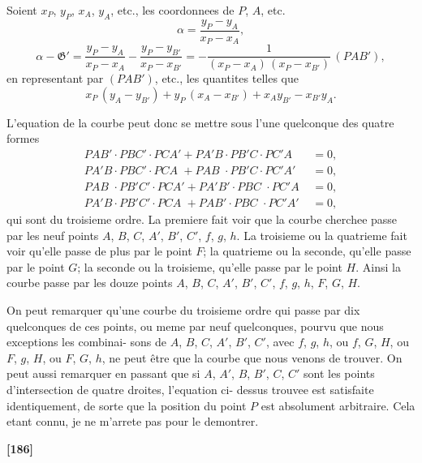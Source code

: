 \documentclass[11pt,a4paper]{article}
\begin{document}
Soient $x_P$, $y_P$, $x_A$, $y_A$, etc., les coordonnees de $P$, $A$, etc.
\[\alpha = \frac{y_P - y_A}{x_P - x_A},\]
\[\alpha - \mathfrak{G}' = \frac{y_P - y_A}{x_P - x_A} - \frac{y_P - y_{B'}}{x_P - x_{B'}} = -\frac{1}{(x_P - x_A)\, (x_P - x_{B'})}\, (PAB'),\]
en representant par $(PAB')$, etc., les quantites telles que
\[x_P\, (y_A - y_{B'}) + y_P\, (x_A - x_{B'}) + x_A y_{B'} - x_{B'} y_A.\]

L'equation de la courbe peut donc se mettre sous l'une quelconque des quatre formes
\begin{align*}
PAB' \cdot PBC' \cdot PCA' + PA'B \cdot PB'C \cdot PC'A &= 0,\\
PA'B \cdot PBC' \cdot PCA \phantom{'} + PAB \phantom{'} \cdot PB'C \cdot PC'A' &= 0,\\
PAB \phantom{'} \cdot PB'C' \cdot PCA' + PA'B' \cdot PBC \phantom{'} \cdot PC'A \phantom{'} &= 0,\\
PA'B \cdot PB'C' \cdot PCA \phantom{'} + PAB' \cdot PBC \phantom{'} \cdot PC'A' &= 0,
\end{align*}
qui sont du troisieme ordre. La premiere fait voir que la courbe cherchee passe par les
neuf points $A$, $B$, $C$, $A'$, $B'$, $C'$, $f$, $g$, $h$. La troisieme ou la quatrieme fait voir qu'elle
passe de plus par le point $F$; la quatrieme ou la seconde, qu'elle passe par le point $G$;
la seconde ou la troisieme, qu'elle passe par le point $H$. Ainsi la courbe passe par les
douze points $A$, $B$, $C$, $A'$, $B'$, $C'$, $f$, $g$, $h$, $F$, $G$, $H$.

On peut remarquer qu'une courbe du troisieme ordre qui passe par dix quelconques
de ces points, ou meme par neuf quelconques, pourvu que nous exceptions les combinai-
sons de $A$, $B$, $C$, $A'$, $B'$, $C'$, avec $f$, $g$, $h$, ou $f$, $G$, $H$, ou $F$, $g$, $H$, ou $F$, $G$, $h$, ne peut
\^etre que la courbe que nous venons de trouver. On peut aussi remarquer en passant
que si $A$, $A'$, $B$, $B'$, $C$, $C'$ sont les points d'intersection de quatre droites, l'equation ci-
dessus trouvee est satisfaite identiquement, de sorte que la position du point $P$ est
absolument arbitraire. Cela etant connu, je ne m'arrete pas pour le demontrer.

\textbf{[186]}
\end{document}
